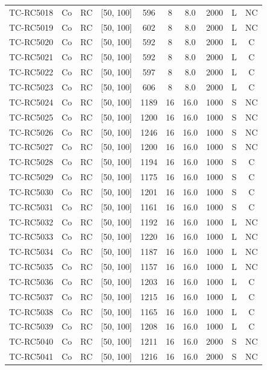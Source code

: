 \begin{longtable}{lccccccccc}
TC-RC5018 & Co & RC & [50, 100] & 596 & 8 & 8.0 & 2000 & L & NC \\
TC-RC5019 & Co & RC & [50, 100] & 602 & 8 & 8.0 & 2000 & L & NC \\
TC-RC5020 & Co & RC & [50, 100] & 592 & 8 & 8.0 & 2000 & L & C \\
TC-RC5021 & Co & RC & [50, 100] & 592 & 8 & 8.0 & 2000 & L & C \\
TC-RC5022 & Co & RC & [50, 100] & 597 & 8 & 8.0 & 2000 & L & C \\
TC-RC5023 & Co & RC & [50, 100] & 606 & 8 & 8.0 & 2000 & L & C \\
TC-RC5024 & Co & RC & [50, 100] & 1189 & 16 & 16.0 & 1000 & S & NC \\
TC-RC5025 & Co & RC & [50, 100] & 1200 & 16 & 16.0 & 1000 & S & NC \\
TC-RC5026 & Co & RC & [50, 100] & 1246 & 16 & 16.0 & 1000 & S & NC \\
TC-RC5027 & Co & RC & [50, 100] & 1200 & 16 & 16.0 & 1000 & S & NC \\
TC-RC5028 & Co & RC & [50, 100] & 1194 & 16 & 16.0 & 1000 & S & C \\
TC-RC5029 & Co & RC & [50, 100] & 1175 & 16 & 16.0 & 1000 & S & C \\
TC-RC5030 & Co & RC & [50, 100] & 1201 & 16 & 16.0 & 1000 & S & C \\
TC-RC5031 & Co & RC & [50, 100] & 1161 & 16 & 16.0 & 1000 & S & C \\
TC-RC5032 & Co & RC & [50, 100] & 1192 & 16 & 16.0 & 1000 & L & NC \\
TC-RC5033 & Co & RC & [50, 100] & 1220 & 16 & 16.0 & 1000 & L & NC \\
TC-RC5034 & Co & RC & [50, 100] & 1187 & 16 & 16.0 & 1000 & L & NC \\
TC-RC5035 & Co & RC & [50, 100] & 1157 & 16 & 16.0 & 1000 & L & NC \\
TC-RC5036 & Co & RC & [50, 100] & 1203 & 16 & 16.0 & 1000 & L & C \\
TC-RC5037 & Co & RC & [50, 100] & 1215 & 16 & 16.0 & 1000 & L & C \\
TC-RC5038 & Co & RC & [50, 100] & 1165 & 16 & 16.0 & 1000 & L & C \\
TC-RC5039 & Co & RC & [50, 100] & 1208 & 16 & 16.0 & 1000 & L & C \\
TC-RC5040 & Co & RC & [50, 100] & 1211 & 16 & 16.0 & 2000 & S & NC \\
TC-RC5041 & Co & RC & [50, 100] & 1216 & 16 & 16.0 & 2000 & S & NC \\

\end{longtable}
